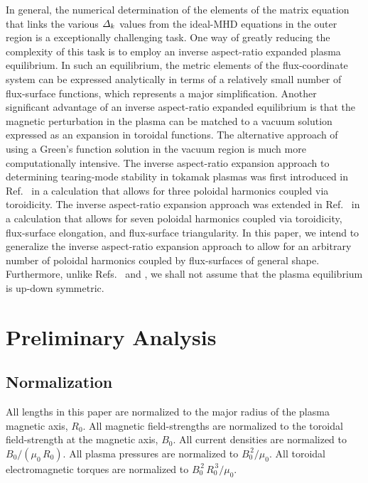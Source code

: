 \documentclass[12pt,prb,aps]{revtex4-1}
\begin{document}
In general, the  numerical determination of the elements of the matrix equation that links the various ${\mit\Delta}_k$ values from the ideal-MHD equations 
in the outer region is a exceptionally challenging task.\cite{nish,pletz,am2,aglas,aglas1}
One way of greatly reducing the complexity of this task is to employ an inverse aspect-ratio expanded plasma equilibrium.\cite{greene} In such an equilibrium,
the metric elements of the flux-coordinate system can be expressed analytically in terms of a relatively small number of  flux-surface functions,
which represents a major simplification.\cite{con0} Another significant advantage of an inverse aspect-ratio expanded equilibrium is that the magnetic perturbation in the plasma can be
matched to a vacuum solution  expressed as an expansion in toroidal functions.\cite{am1} The alternative approach of using a Green's
function solution in the vacuum region is much more computationally intensive.\cite{chance,xu} The inverse aspect-ratio expansion approach to determining tearing-mode stability in tokamak plasmas 
was first introduced in Ref.~ in a calculation that allows for three  poloidal harmonics coupled via toroidicity. The
inverse aspect-ratio expansion approach was extended in Ref.~ in a calculation that allows for seven poloidal harmonics coupled via toroidicity, flux-surface elongation, and
flux-surface triangularity. In this paper, we intend to generalize the inverse aspect-ratio expansion  approach to allow for an arbitrary number of poloidal harmonics coupled
by flux-surfaces of general shape. Furthermore, unlike Refs.~ and , we shall not assume that the plasma
equilibrium 
is up-down symmetric. 

\section{Preliminary Analysis}
\subsection{Normalization}\label{coords}
All lengths in this paper are normalized to  the major radius of the plasma magnetic axis, $R_0$. All magnetic field-strengths
are normalized to the  toroidal field-strength at the magnetic axis, $B_0$. All current densities are normalized to $B_0/(\mu_0\,R_0)$. All plasma pressures are normalized to $B_0^{\,2}/\mu_0$.
All toroidal electromagnetic torques are normalized to $B_0^{\,2}\,R_0^{\,3}/\mu_0$. 
\end{document}
